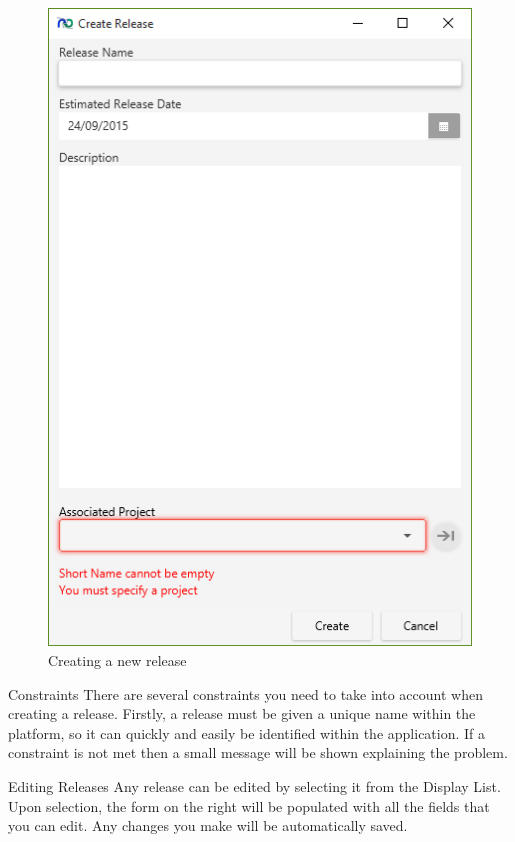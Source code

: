 \begin{figure}[H]
\centering
\includegraphics[width=\textwidth]{images/screenshots/releases3.PNG}
\caption{Creating a new release}
\label{fig:new_project}
\end{figure}

Constraints
\newline
There are several constraints you need to take into account when creating a release. Firstly, a release must be given a unique name within the platform, so it can quickly and easily be identified within the application. If a constraint is not met then a small message will be shown explaining the problem.

Editing Releases
\newline
Any release can be edited by selecting it from the Display List. Upon selection, the form on the right will be populated with all the fields that you can edit. Any changes you make will be automatically saved.

